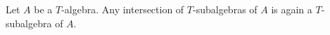 Let $A$ be a $T$-algebra. Any intersection of $T$-subalgebras of $A$ is again a $T$-subalgebra of $A$.
